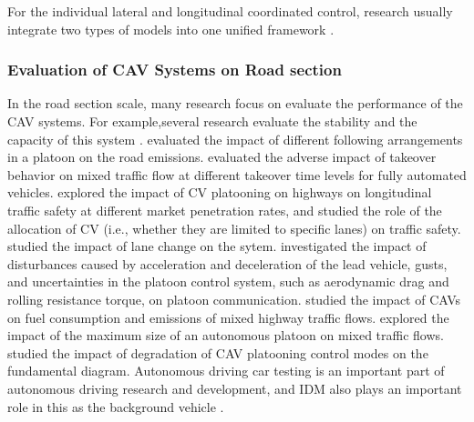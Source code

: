 \documentclass[a4paper,fleqn]{cas-sc}
\begin{document}
For the individual lateral and longitudinal coordinated control, research usually integrate two types of models into one unified framework \citep{kanagaraj_self-driven_2018,li_developing_2023,mullakkal-babu_hybrid_2021}.

\subsubsection{Evaluation of CAV Systems on Road section}

In the road section scale, many research focus on evaluate the performance of the CAV systems. For example,several research evaluate the stability and the capacity of this system \citep{qin_analytical_2021,qinStabilityAnalysisConnectedVehicles2023a,sunStabilityExtensionCarFollowingModel2023b,sunRelationshipCarFollowingString2020b,shang_impacts_2021,talebpourEffectInformationAvailabilityStability2018a,talebpourInfluenceConnectedAutonomousVehicles2016a,wang_stability_2019,yao_linear_2021,zhou_analytical_2021}. \cite{alhariqiImpactVehicleArrangementMixed2023a,zhou_modeling_2020} evaluated the impact of different following arrangements in a platoon on the road emissions. \cite{mullakkal-babu_comparative_2022} evaluated the adverse impact of takeover behavior on mixed traffic flow at different takeover time levels for fully automated vehicles. \cite{rahman_longitudinal_2018} explored the impact of CV platooning on highways on longitudinal traffic safety at different market penetration rates, and studied the role of the allocation of CV (i.e., whether they are limited to specific lanes) on traffic safety. \cite{wangEgoEfficientLaneChangesConnected2022a} studied the impact of lane change on the sytem. \cite{wuTimeDependentPerformanceAnalysis80211pBased2020a} investigated the impact of disturbances caused by acceleration and deceleration of the lead vehicle, gusts, and uncertainties in the platoon control system, such as aerodynamic drag and rolling resistance torque, on platoon communication.
\cite{yao_fuel_2021} studied the impact of CAVs on fuel consumption and emissions of mixed highway traffic flows. \cite{yaoAnalysisImpactMaximumPlatoon2023a} explored the impact of the maximum size of an autonomous platoon on mixed traffic flows. \cite{zhou_impact_2021} studied
the impact of degradation of CAV platooning control modes on the fundamental diagram. Autonomous driving car testing is an important part of autonomous driving research and development, and IDM also plays an important role in this as the background vehicle \citep{sun_scenario-based_2022,li_scegene_2022,sun_adaptive_2022,cao_autonomous_2023,zhang_accelerated_2024,zhang_bayesian_2024}. 
\end{document}
